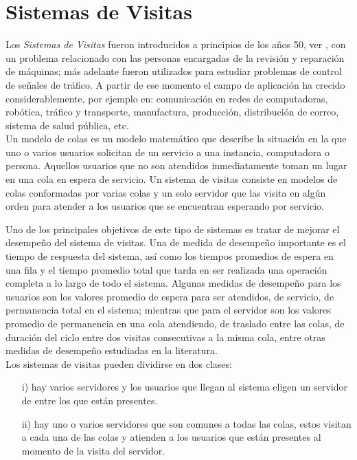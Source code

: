 \documentclass{article}
\numberwithin{equation}{section}
\begin{document}
\section{Sistemas de Visitas}

Los {\emph{Sistemas de Visitas}} fueron introducidos a principios de los a\~nos 50, ver \cite{Boxma,BoonMeiWinands,LevySidi,TesisRoubos,Takagi,Semenova}, con un problema relacionado con las personas encargadas de la revisi\'on y reparaci\'on de m\'aquinas; m\'as adelante fueron utilizados para estudiar problemas de control de se\~nales de tr\'afico. A partir de ese momento el campo de aplicaci\'on ha crecido considerablemente, por ejemplo en: comunicaci\'on en redes de computadoras, rob\'otica, tr\'afico y transporte, manufactura, producci\'on, distribuci\'on de correo, sistema de salud p\'ublica, etc.\\

Un modelo de colas es un modelo matem\'atico que describe la situaci\'on en la que uno o varios usuarios solicitan de un servicio a una instancia, computadora o persona. Aquellos usuarios que no son atendidos inmediatamente toman un lugar en una cola en espera de servicio. Un sistema de visitas consiste en modelos de colas conformadas por varias colas y un solo servidor que las visita en alg\'un orden para atender a los usuarios que se encuentran esperando por servicio.

Uno de los principales objetivos de este tipo de sistemas es tratar de mejorar el desempe\~no del sistema de visitas. Una de medida de desempe\~no importante es el tiempo de respuesta del sistema, as\'i como los tiempos promedios de espera en una fila y el tiempo promedio total que tarda en ser realizada una operaci\'on completa a lo largo de todo el sistema. Algunas medidas de desempe\~no para los usuarios son los valores promedio de espera para ser atendidos, de servicio, de permanencia total en el sistema; mientras que para el servidor son los valores promedio de permanencia en una cola atendiendo, de traslado entre las colas, de duraci\'on del ciclo entre dos visitas consecutivas a la misma cola, entre otras medidas de desempe\~no estudiadas en la literatura.\\

Los sistemas de visitas pueden dividirse en dos clases:
\begin{itemize}
\item[i)] hay varios servidores y los usuarios que llegan al sistema eligen un servidor de entre los que est\'an presentes.

\item[ii)] hay uno o varios servidores que son comunes a todas las colas, estos visitan a cada una de las colas y atienden a los usuarios que est\'an presentes al momento de la visita del
servidor.
\end{itemize}
\end{document}
